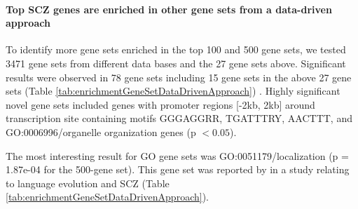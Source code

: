\documentclass[]{article}
\begin{document}
\paragraph{Top SCZ genes are enriched in other gene sets from a
  data-driven approach}

To identify more gene sets enriched in the top 100 and 500 gene sets,
we tested 3471 gene sets from different data bases and the 27 gene
sets above. Significant results were observed in 78 gene sets including 15 gene sets in the
 above 27 gene sets (Table \ref{tab:enrichmentGeneSetDataDrivenApproach})
. Highly significant novel gene sets included genes with promoter regions [-2kb, 2kb]
 around transcription site containing motifs GGGAGGRR, TGATTTRY,
 AACTTT, and GO:0006996/organelle organization genes (p $< 0.05$).

The most interesting result for GO gene
sets was GO:0051179/localization (p = 1.87e-04 for the 500-gene set). This gene set was reported by
\cite{murphy2016bridging} in a study relating to language
evolution and SCZ (Table \ref{tab:enrichmentGeneSetDataDrivenApproach}).
\end{document}
